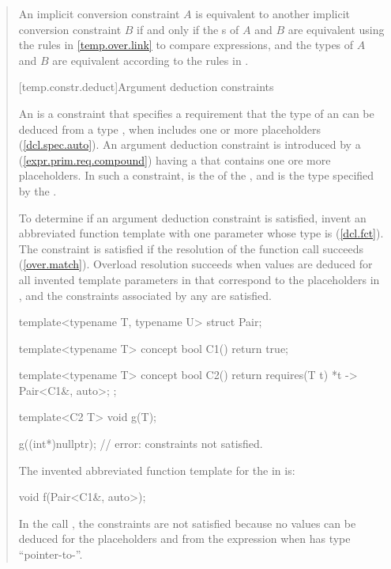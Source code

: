 \begin{quote}
\pnum
An implicit conversion constraint $A$ is equivalent to another implicit 
conversion constraint $B$ if and only if the s 
of $A$ and $B$ are equivalent using the rules in
\ref{temp.over.link} to compare expressions, and the types
of $A$ and $B$ are equivalent according to the rules in
.


[temp.constr.deduct]{Argument deduction constraints}

\pnum
An  is a constraint that specifies 
a requirement that the type of an  
can be deduced from a type , when  includes one or more 
placeholders (\ref{dcl.spec.auto}).
% 
\enternote
An argument deduction constraint is introduced by a
 (\ref{expr.prim.req.compound}) having a
 that contains one ore more placeholders.
% 
In such a constraint,  is the  of the 
, and  is the type specified
by the .
\exitnote

\pnum
To determine if an argument deduction constraint is satisfied, invent
an abbreviated function template  with one parameter whose
type is  (\ref{dcl.fct}). 
% 
The constraint is satisfied if the resolution of the function call 
 succeeds (\ref{over.match}).
% 
\enternote
Overload resolution succeeds when values are deduced for all invented
template parameters in  that correspond to the placeholders in 
, and the constraints associated by any 
 are satisfied.
\exitnote
% 
\enterexample
\begin{codeblock}
template<typename T, typename U> struct Pair;

template<typename T>
  concept bool C1() { return true; }

template<typename T>
  concept bool C2() { return requires(T t) { {*t} -> Pair<C1&, auto>; }; }

template<C2 T> void g(T);

g((int*)nullptr); // error: constraints not satisfied.
\end{codeblock}
The invented abbreviated function template  for the 
 in  is:
\begin{codeblock}
void f(Pair<C1&, auto>);
\end{codeblock}
In the call , the constraints are not satisfied 
because no values can be deduced for the placeholders  and 
 from the expression  when  has type
``pointer-to-''.
\exitexample


\end{quote}
